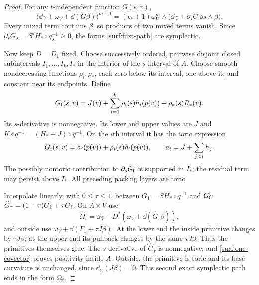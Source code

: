 \begin{proof}
For any $t$-independent function $G(s,v)$,
\begin{equation}\label{surf:one-covector}
 \bigl(\dd\gamma+\omega_V+\dd(G\beta)\bigr)^{m+1}
  =(m+1)\omega_V^m\wedge
        \bigl(\dd\gamma+\partial_sG\,\dd s\wedge\beta\bigr).
\end{equation}
Every mixed term contains $\beta$, so products of two mixed terms
vanish.  Since
$\partial_sG_\lambda=S'H_*\circ q_\lambda^{-1}\geq0$,
the forms \eqref{surf:first-path} are symplectic.

Now keep $D=D_1$ fixed.  Choose successively ordered, pairwise
disjoint closed subintervals $I_1,\ldots,I_k,I_*$ in the interior
of the $s$-interval of $A$.  Choose smooth nondecreasing functions
$\rho_i,\rho_*$, each zero below its interval, one above it, and
constant near its endpoints.  Define
\begin{equation}\label{surf:G-final}
 G_{\rm f}(s,v)
      =J(v)+\sum_{i=1}^k\rho_i(s)h_i(p(v))+\rho_*(s)R_*(v).
\end{equation}
Its $s$-derivative is nonnegative.  Its lower and upper values are
$J$ and $K\circ q^{-1}=(H_*+J)\circ q^{-1}$.
On the $i$th interval it has the toric expression
\begin{equation}\label{surf:toric-layer}
 G_{\rm f}(s,v)=a_i(p(v))+\rho_i(s)h_i(p(v)),\qquad
 a_i=J+\sum_{j<i}h_j .
\end{equation}
The possibly nontoric contribution to $\partial_sG_{\rm f}$ is supported
in $I_*$; the residual term may persist above $I_*$. All preceding
packing layers are toric.

Interpolate linearly, with $0\leq\tau\leq1$, between
$G_1=SH_*\circ q^{-1}$ and $G_{\rm f}$:
$\widehat G_\tau=(1-\tau)G_1+\tau G_{\rm f}$.
On $A\times V$ use
\[
 \widehat\Omega_\tau=\dd\gamma+
                    D^*(\omega_V+\dd(\widehat G_\tau\beta)),
\]
and outside use $\omega_V+\dd(\Gamma_1+\tau J\beta)$.
At the lower end the inside primitive changes by $\tau J\beta$;
at the upper end its pullback changes by the same $\tau J\beta$.
Thus the primitives themselves glue.  The $s$-derivative of
$\widehat G_\tau$ is nonnegative, and \eqref{surf:one-covector}
proves positivity inside $A$.  Outside, the primitive is toric
and its base curvature is unchanged, since $\dd_C(J\beta)=0$.
This second exact symplectic path ends in the form $\Omega_{\rm f}$.


\end{proof}

